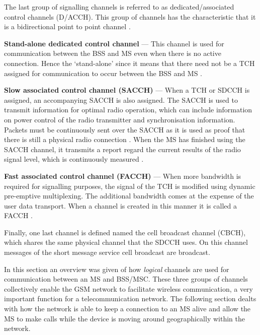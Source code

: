 The last group of signalling channels is referred to as dedicated/associated control channels (D/ACCH). This group of channels has the characteristic that it is a bidirectional point to point channel \cite{GSMArchitectureProtocolsServices}.
\begin{description}
\item{\textbf{Stand-alone dedicated control channel}} --- This channel is used for communication between the BSS and MS even when there is no active connection. Hence the `stand-alone' since it means that there need not be a TCH assigned for communication to occur between the BSS and MS \cite{GSMArchitectureProtocolsServices}.
\item{\textbf{Slow associated control channel (SACCH)}} --- When a TCH or SDCCH is assigned, an accompanying SACCH is also assigned. The SACCH is used to transmit information for optimal radio operation, which can include information on power control of the radio transmitter and synchronisation information. Packets must be continuously sent over the SACCH as it is used as proof that there is still a physical radio connection \cite{GSMArchitectureProtocolsServices}. When the MS has finished using the SACCH channel, it transmits a report regard the current results of the radio signal level, which is continuously measured \cite{GSMArchitectureProtocolsServices}.
\item{\textbf{Fast associated control channel (FACCH)}} --- When more bandwidth is required for signalling purposes, the signal of the TCH is modified using dynamic pre-emptive multiplexing. The additional bandwidth comes at the expense of the user data transport. When a channel is created in this manner it is called a FACCH \cite{GSMArchitectureProtocolsServices}.
\end{description}

Finally, one last channel is defined named the cell broadcast channel (CBCH), which shares the same physical channel that the SDCCH uses. On this channel messages of the short message service cell broadcast are broadcast\cite{GSMArchitectureProtocolsServices}.

In this section an overview was given of how \emph{logical} channels are used for communication between an MS and BSS/MSC. These three groups of channels collectively enable the GSM network to facilitate wireless communication, a very important function for a telecommunication network. The following section dealts with how the network is able to keep a connection to an MS alive and allow the MS to make calls while the device is moving around geographically within the network.
